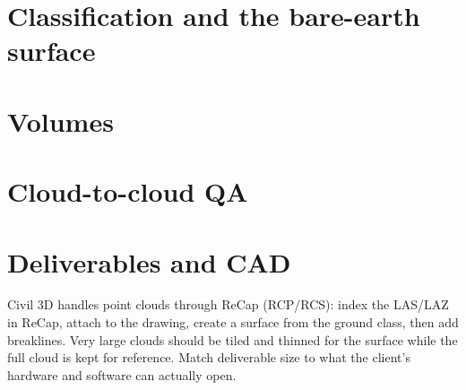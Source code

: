 \section{Classification and the bare-earth surface}


\section{Volumes}


\section{Cloud-to-cloud QA}


\section{Deliverables and CAD}

\begin{tip}
Civil 3D handles point clouds through ReCap (RCP/RCS): index the LAS/LAZ in ReCap, attach to the drawing, create a surface from the ground class, then add breaklines. Very large clouds should be tiled and thinned for the surface while the full cloud is kept for reference. Match deliverable size to what the client's hardware and software can actually open.
\end{tip}
